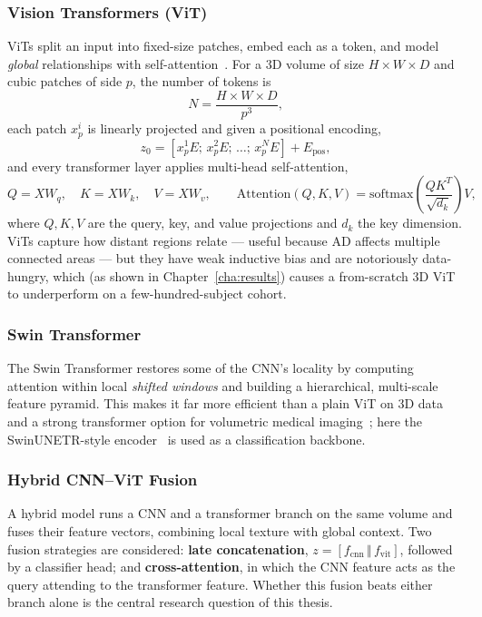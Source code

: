 \subsubsection{Vision Transformers (ViT)}
ViTs split an input into fixed-size patches, embed each as a token, and model \emph{global} relationships with self-attention~\cite{dosovitskiy2021image,vaswani2017attention}. For a 3D volume of size $H\times W\times D$ and cubic patches of side $p$, the number of tokens is
\[
N = \frac{H \times W \times D}{p^{3}},
\]
each patch $x_p^{i}$ is linearly projected and given a positional encoding,
\[
z_{0} = \left[ x^{1}_{p} E;\, x^{2}_{p} E;\,\ldots;\, x^{N}_{p} E \right] + E_{\text{pos}},
\]
and every transformer layer applies multi-head self-attention,
\[
Q = XW_{q}, \quad K = XW_{k}, \quad V = XW_{v}, \qquad
\text{Attention}(Q,K,V) = \text{softmax}\!\left(\frac{QK^{T}}{\sqrt{d_{k}}}\right)V,
\]
where $Q,K,V$ are the query, key, and value projections and $d_k$ the key dimension. ViTs capture how distant regions relate --- useful because AD affects multiple connected areas --- but they have weak inductive bias and are notoriously data-hungry, which (as shown in Chapter~\ref{cha:results}) causes a from-scratch 3D ViT to underperform on a few-hundred-subject cohort.

\subsubsection{Swin Transformer}
The Swin Transformer restores some of the CNN's locality by computing attention within local \emph{shifted windows} and building a hierarchical, multi-scale feature pyramid. This makes it far more efficient than a plain ViT on 3D data and a strong transformer option for volumetric medical imaging~\cite{liu2021swin}; here the SwinUNETR-style encoder~\cite{hatamizadeh2021swinunetr} is used as a classification backbone.

\subsubsection{Hybrid CNN--ViT Fusion}
A hybrid model runs a CNN and a transformer branch on the same volume and fuses their feature vectors, combining local texture with global context. Two fusion strategies are considered: \textbf{late concatenation}, $z = [f_{\text{cnn}} \,\Vert\, f_{\text{vit}}]$, followed by a classifier head; and \textbf{cross-attention}, in which the CNN feature acts as the query attending to the transformer feature. Whether this fusion beats either branch alone is the central research question of this thesis.

